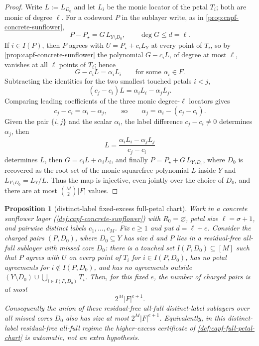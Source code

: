 \documentclass[11pt]{article}
\newtheorem{proposition}[proposition]{Proposition}
\theoremstyle{definition}
\theoremstyle{remark}
\begin{document}
\begin{proof}
Write $L:=L_{D_0}$ and let $L_i$ be the monic locator of the petal $T_i$; both are monic of degree $\ell$.  For a codeword $P$ in the sublayer write, as in \cref{prop:capf-concrete-sunflower},
\[
        P-P_\star=G\,L_{Y\setminus D_0},
        \qquad \deg G\le d=\ell .
\]
If $i\in I(P)$, then $P$ agrees with $U=P_\star+c_iL_Y$ at every point of $T_i$, so by \cref{prop:capf-concrete-sunflower} the polynomial $G-c_iL$, of degree at most $\ell$, vanishes at all $\ell$ points of $T_i$; hence
\[
        G-c_iL=\alpha_iL_i
        \qquad\text{for some }\alpha_i\in F .
\]
Subtracting the identities for the two smallest touched petals $i<j$,
\[
        (c_j-c_i)L=\alpha_iL_i-\alpha_jL_j .
\]
Comparing leading coefficients of the three monic degree-$\ell$ locators gives
\[
        c_j-c_i=\alpha_i-\alpha_j,
        \qquad\text{so}\qquad
        \alpha_j=\alpha_i-(c_j-c_i).
\]
Given the pair $\{i,j\}$ and the scalar $\alpha_i$, the label difference $c_j-c_i\ne0$ determines $\alpha_j$, then
\[
        L=\frac{\alpha_iL_i-\alpha_jL_j}{c_j-c_i}
\]
determines $L$, then $G=c_iL+\alpha_iL_i$, and finally $P=P_\star+G\,L_{Y\setminus D_0}$, where $D_0$ is recovered as the root set of the monic squarefree polynomial $L$ inside $Y$ and $L_{Y\setminus D_0}=L_Y/L$.  Thus the map is injective, even jointly over the choice of $D_0$, and there are at most $\binom M2|F|$ values.
\end{proof}

\begin{proposition}[distinct-label fixed-excess full-petal chart]\label{prop:capf-distinct-excess-chart}
Work in a concrete sunflower layer \textup{(\cref{def:capf-concrete-sunflower})} with $R_0=\varnothing$, petal size $\ell=\sigma+1$, and pairwise distinct labels $c_1,\ldots,c_M$.  Fix $e\ge1$ and put $d=\ell+e$.  Consider the charged pairs $(P,D_0)$, where $D_0\subseteq Y$ has size $d$ and $P$ lies in a residual-free all-full sublayer with missed core $D_0$: there is a touched set $I(P,D_0)\subseteq[M]$ such that $P$ agrees with $U$ on every point of $T_i$ for $i\in I(P,D_0)$, has no petal agreements for $i\notin I(P,D_0)$, and has no agreements outside $(Y\setminus D_0)\cup\bigcup_{i\in I(P,D_0)}T_i$.  Then, for this fixed $e$, the number of charged pairs is at most
\[
        2^M |F|^{e+1}.
\]
Consequently the union of these residual-free all-full distinct-label sublayers over all missed cores $D_0$ also has size at most $2^M|F|^{e+1}$.  Equivalently, in this distinct-label residual-free all-full regime the higher-excess certificate of \cref{def:capf-full-petal-chart} is automatic, not an extra hypothesis.
\end{proposition}
\end{document}
